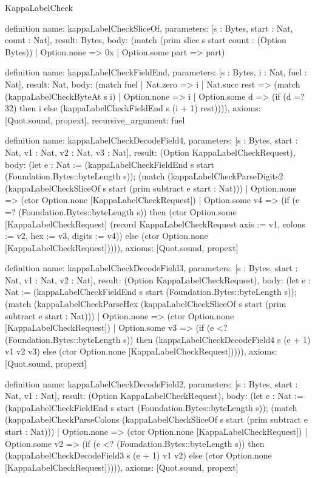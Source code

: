 \begin{lexlean}{KappaLabelCheck}
\begin{semanticmodule}
definition{
  name: kappaLabelCheckSliceOf,
  parameters: [s : Bytes, start : Nat, count : Nat],
  result: Bytes,
  body: (match (prim slice s start count : (Option Bytes))
    | Option.none => 0x
    | Option.some part => part)
}

definition{
  name: kappaLabelCheckFieldEnd,
  parameters: [s : Bytes, i : Nat, fuel : Nat],
  result: Nat,
  body: (match fuel
    | Nat.zero => i
    | Nat.succ rest => (match (kappaLabelCheckByteAt s i)
      | Option.none => i
      | Option.some d => (if (d =? 32) then i else (kappaLabelCheckFieldEnd s (i + 1) rest)))),
  axioms: [Quot.sound, propext],
  recursive_argument: fuel
}

definition{
  name: kappaLabelCheckDecodeField4,
  parameters: [s : Bytes, start : Nat, v1 : Nat, v2 : Nat, v3 : Nat],
  result: (Option KappaLabelCheckRequest),
  body: (let e : Nat := (kappaLabelCheckFieldEnd s start (Foundation.Bytes::byteLength s)); (match (kappaLabelCheckParseDigits2 (kappaLabelCheckSliceOf s start (prim subtract e start : Nat)))
    | Option.none => (ctor Option.none [KappaLabelCheckRequest])
    | Option.some v4 => (if (e =? (Foundation.Bytes::byteLength s)) then (ctor Option.some [KappaLabelCheckRequest] (record KappaLabelCheckRequest {axis := v1, colons := v2, hex := v3, digits := v4})) else (ctor Option.none [KappaLabelCheckRequest])))),
  axioms: [Quot.sound, propext]
}

definition{
  name: kappaLabelCheckDecodeField3,
  parameters: [s : Bytes, start : Nat, v1 : Nat, v2 : Nat],
  result: (Option KappaLabelCheckRequest),
  body: (let e : Nat := (kappaLabelCheckFieldEnd s start (Foundation.Bytes::byteLength s)); (match (kappaLabelCheckParseHex (kappaLabelCheckSliceOf s start (prim subtract e start : Nat)))
    | Option.none => (ctor Option.none [KappaLabelCheckRequest])
    | Option.some v3 => (if (e <? (Foundation.Bytes::byteLength s)) then (kappaLabelCheckDecodeField4 s (e + 1) v1 v2 v3) else (ctor Option.none [KappaLabelCheckRequest])))),
  axioms: [Quot.sound, propext]
}

definition{
  name: kappaLabelCheckDecodeField2,
  parameters: [s : Bytes, start : Nat, v1 : Nat],
  result: (Option KappaLabelCheckRequest),
  body: (let e : Nat := (kappaLabelCheckFieldEnd s start (Foundation.Bytes::byteLength s)); (match (kappaLabelCheckParseColons (kappaLabelCheckSliceOf s start (prim subtract e start : Nat)))
    | Option.none => (ctor Option.none [KappaLabelCheckRequest])
    | Option.some v2 => (if (e <? (Foundation.Bytes::byteLength s)) then (kappaLabelCheckDecodeField3 s (e + 1) v1 v2) else (ctor Option.none [KappaLabelCheckRequest])))),
  axioms: [Quot.sound, propext]
}


\end{semanticmodule}
\end{lexlean}
